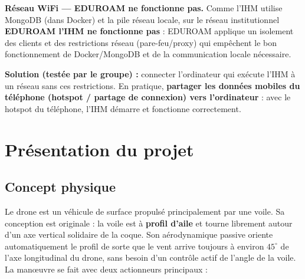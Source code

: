 \documentclass[12pt,a4paper]{article}
\begin{document}
\begin{warningbox}
  \textbf{R\'eseau WiFi --- EDUROAM ne fonctionne pas.} Comme l'IHM utilise MongoDB
  (dans Docker) et la pile r\'eseau locale, sur le r\'eseau institutionnel
  \textbf{EDUROAM l'IHM ne fonctionne pas} : EDUROAM applique un isolement des clients
  et des restrictions r\'eseau (pare-feu/proxy) qui emp\^echent le bon fonctionnement
  de Docker/MongoDB et de la communication locale n\'ecessaire.

  \textbf{Solution (test\'ee par le groupe) :} connecter l'ordinateur qui ex\'ecute
  l'IHM à un r\'eseau sans ces restrictions. En pratique, \textbf{partager les
  donn\'ees mobiles du t\'el\'ephone (hotspot / partage de connexion) vers
  l'ordinateur} : avec le hotspot du t\'el\'ephone, l'IHM d\'emarre et fonctionne
  correctement.
\end{warningbox}

\section{Pr\'esentation du projet}

\subsection{Concept physique}

Le drone est un v\'ehicule de surface propuls\'e principalement par une voile. Sa
conception est originale : la voile est à \textbf{profil d'aile} et tourne librement
autour d'un axe vertical solidaire de la coque. Son a\'erodynamique passive oriente
automatiquement le profil de sorte que le vent arrive toujours à environ
$45^{\circ}$ de l'axe longitudinal du drone, sans besoin d'un contr\^ole actif de
l'angle de la voile. La man\oe uvre se fait avec deux actionneurs principaux :
\end{document}
